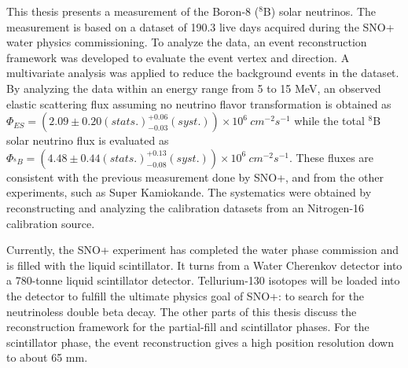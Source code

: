 This thesis presents a measurement of the Boron-8 ($^8$B) solar neutrinos. The measurement is based on a dataset of 190.3 live days acquired during the SNO+ water physics commissioning. To analyze the data, an event reconstruction framework was developed to evaluate the event vertex and direction. A multivariate analysis was applied to reduce the background events in the dataset. By analyzing the data within an energy range from 5 to 15 MeV, an observed elastic scattering flux assuming no neutrino flavor transformation is obtained as $\Phi_{ES}=(2.09 \pm 0.20(stats.)^{+0.06}_{-0.03}(syst.))\times10^6~cm^{-2}s^{-1}$ while the total $^8$B solar neutrino flux is evaluated as $\Phi_{^8B}=(4.48 \pm 0.44(stats.)^{+0.13}_{-0.08}(syst.))\times10^6~cm^{-2}s^{-1}$. These fluxes are consistent with the previous measurement done by SNO+\cite{anderson2019measurement}, and from the other experiments, such as Super Kamiokande\cite{abe2016solar}. The systematics were obtained by reconstructing and analyzing the calibration datasets from an Nitrogen-16 calibration source.

Currently, the SNO+ experiment has completed the water phase commission and is filled with the liquid scintillator. It turns from a Water Cherenkov detector into a 780-tonne liquid scintillator detector. Tellurium-130 isotopes will be loaded into the detector to fulfill the ultimate physics goal of SNO+: to search for the neutrinoless double beta decay. The other parts of this thesis discuss the reconstruction framework for the partial-fill and scintillator phases. For the scintillator phase, the event reconstruction gives a high position resolution down to about 65 mm. %
